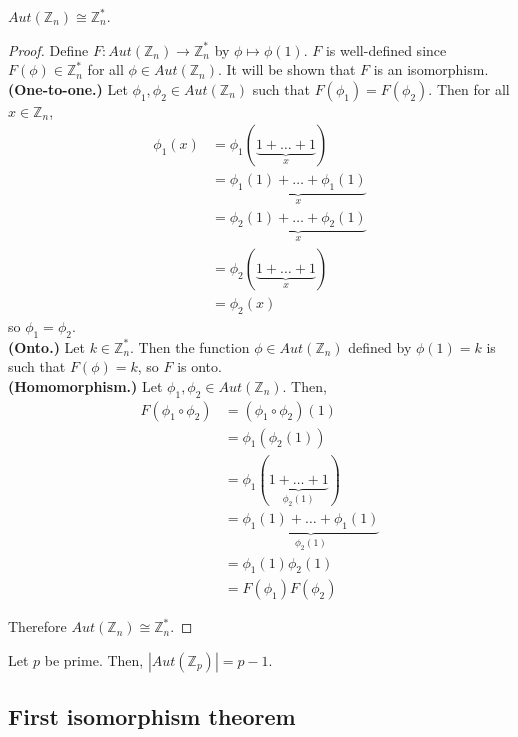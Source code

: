 \documentclass[12pt]{article}
\newcommand{\Z}{\mathbb{Z}}
\begin{document}
	\begin{mythm}{}{}
		$Aut(\Z_n)\cong\Z_n^*$.
		\begin{proof}
			Define $F:Aut(\Z_n)\to\Z_n^*$ by $\phi\mapsto\phi(1)$. $F$ is well-defined since $F(\phi)\in\Z_n^*$ for all $\phi\in Aut(\Z_n)$. It will be shown that $F$ is an isomorphism.\\
			
			\textbf{(One-to-one.)} Let $\phi_1, \phi_2\in Aut(\Z_n)$ such that $F(\phi_1)=F(\phi_2)$. Then for all $x\in\Z_n$,
			\begin{align*}
				\phi_1(x)&=\phi_1(\underbrace{1+\dots+1}_x)\\
				&=\underbrace{\phi_1(1)+\dots+\phi_1(1)}_x\\
				&=\underbrace{\phi_2(1)+\dots+\phi_2(1)}_x\\
				&=\phi_2(\underbrace{1+\dots+1}_x)\\
				&=\phi_2(x)
			\end{align*}
			so $\phi_1=\phi_2$.\\
			
			\textbf{(Onto.)} Let $k\in\Z_n^*$. Then the function $\phi\in Aut(\Z_n)$ defined by $\phi(1)=k$ is such that $F(\phi)=k$, so $F$ is onto.\\
			
			\textbf{(Homomorphism.)} Let $\phi_1, \phi_2\in Aut(\Z_n)$. Then,
			\begin{align*}
				F(\phi_1\circ\phi_2)&=(\phi_1\circ\phi_2)(1)\\
				&=\phi_1(\phi_2(1))\\
				&=\phi_1(\underbrace{1+\dots+1}_{\phi_2(1)})\\
				&=\underbrace{\phi_1(1)+\dots+\phi_1(1)}_{\phi_2(1)}\\
				&=\phi_1(1)\phi_2(1)\\
				&=F(\phi_1)F(\phi_2)
			\end{align*}
			
			Therefore $Aut(\Z_n)\cong\Z_n^*$.
		\end{proof}
	\end{mythm}
	
	\begin{myex}{}{}
		Let $p$ be prime. Then, $|Aut(\Z_p)|=p-1$.
	\end{myex}
	
	\subsection{First isomorphism theorem}
	
\end{document}
